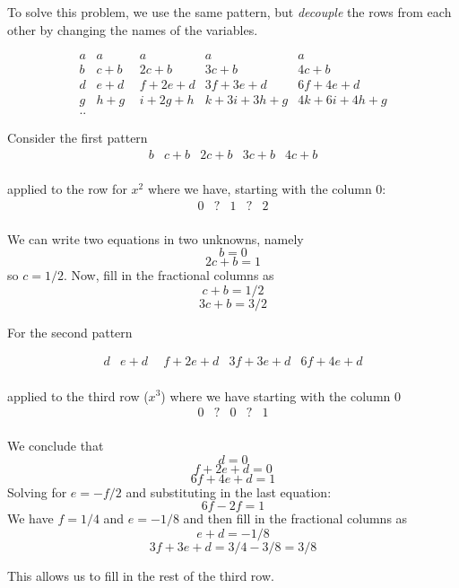 \documentclass[11pt, oneside]{article}
\begin{document}
To solve this problem, we use the same pattern, but \emph{decouple} the rows from each other by changing the names of the variables.

\[
\begin{matrix}
a & a & a & a & a  \\
b & c+b & 2c+b & 3c + b & 4c+b  \\
d & e + d \ \ & f + 2e + d & 3f + 3e + d & 6f + 4e + d \\
g & h + g & i + 2g + h &  k + 3i + 3h + g & 4k + 6i + 4h + g  \\
..
\end{matrix}
\]

Consider the first pattern
\[
\begin{matrix}
b & c+b & 2c+b & 3c + b & 4c+b  \\
\end{matrix}
\]

applied to the row for $x^2$ where we have, starting with the column $0$:
\[
\begin{matrix}
0 & ? & 1 & ? & 2  \\
\end{matrix}
\]

We can write two equations in two unknowns, namely
\[ b = 0 \]
\[ 2c + b = 1 \]
so $c = 1/2$.  Now, fill in the fractional columns as
\[ c + b = 1/2 \]
\[ 3c + b = 3/2 \]

For the second pattern

\[
\begin{matrix}
d & e + d \ \ & f + 2e + d & 3f + 3e + d & 6f + 4e + d \\
\end{matrix}
\]

applied to the third row ($x^3$) where we have starting with the column $0$
\[
\begin{matrix}
0 & ? & 0 & ? & 1  \\
\end{matrix}
\]

We conclude that
\[ d = 0 \]
\[ f + 2e + d = 0 \]
\[ 6f + 4e + d = 1 \]
Solving for $e = -f/2$ and substituting in the last equation:
\[ 6f - 2f = 1 \]
We have $f = 1/4$ and $e = -1/8$ and then fill in the fractional columns as
\[ e + d = -1/8 \]
\[ 3f + 3e + d = 3/4 - 3/8 = 3/8 \]

This allows us to fill in the rest of the third row.
\end{document}
